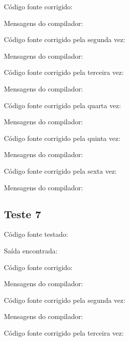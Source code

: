 \documentclass[11pt]{article}
\begin{document}
		Código fonte corrigido:
		
		
		Mensagens do compilador:
		
						
		Código fonte corrigido pela segunda vez:
		
		
		Mensagens do compilador:
		
		
		Código fonte corrigido pela terceira vez:
		
		
		Mensagens do compilador:
		
				
		Código fonte corrigido pela quarta vez:
		
		
		Mensagens do compilador:
		
						
		Código fonte corrigido pela quinta vez:
		
		
		Mensagens do compilador:
		
								
		Código fonte corrigido pela sexta vez:
		
		
		Mensagens do compilador:
		

	\newpage
	\subsection{Teste 7}
	
		Código fonte testado:
		
			
		Saída encontrada:
		
								
		Código fonte corrigido:
		
		
		Mensagens do compilador:
		
								
		Código fonte corrigido pela segunda vez:
		
		
		Mensagens do compilador:
		
										
		Código fonte corrigido pela terceira vez:
		
		
\end{document}
